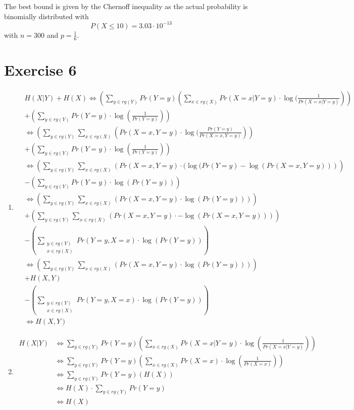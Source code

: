 \documentclass[12pt]{article}
\begin{document}
The best bound is given by the Chernoff inequality as the actual probability is binomially distributed with \[ P(X\leq 10) = 3.03 \cdot 10^{-13} \] with $n = 300 $ and $p = \frac{1}{6}$.

\section*{Exercise 6}
\begin{enumerate}[label=(\alph*)]
	\item	\begin{align*}
				& H(X \vert Y) + H(X) \Leftrightarrow (\sum_{y \in rg(Y)} Pr(Y=y) \left( \sum_{x \in rg(X)} Pr(X=x \vert Y=y) \cdot \log(\frac{1}{Pr(X=x \vert Y=y)} \right)) \\
				& + (\sum_{y \in rg(Y)} Pr(Y=y) \cdot \log(\frac{1}{Pr(Y=y)})) \\
				&\Leftrightarrow (\sum_{y \in rg(Y)} \sum_{x \in rg(X)} \left(  Pr(X=x, Y=y) \cdot \log(\frac{Pr(Y=y)}{Pr(X=x, Y=y)} \right)) \\
				& + (\sum_{y \in rg(Y)} Pr(Y=y) \cdot \log(\frac{1}{Pr(Y=y)})) \\
				&\Leftrightarrow (\sum_{y \in rg(Y)} \sum_{x \in rg(X)} \left( Pr(X=x, Y=y) \cdot (\log(Pr(Y=y) - \log(Pr(X=x, Y=y)) \right)) \\
				& - (\sum_{y \in rg(Y)} Pr(Y=y) \cdot \log(Pr(Y=y))) \\
				&\Leftrightarrow (\sum_{y \in rg(Y)} \sum_{x \in rg(X)} \left( Pr(X=x, Y=y) \cdot \log(Pr(Y=y)) \right)) \\
				& + (\sum_{y \in rg(Y)} \sum_{x \in rg(X)} \left( Pr(X=x, Y=y) \cdot -\log(Pr(X=x, Y=y)) \right)) \\
				& - (\sum\limits_{\substack{y \in rg(Y) \\ x \in rg(X)}} Pr(Y=y, X=x) \cdot \log(Pr(Y=y))) \\
				&\Leftrightarrow (\sum_{y \in rg(Y)} \sum_{x \in rg(X)} \left( Pr(X=x, Y=y) \cdot \log(Pr(Y=y)) \right)) \\
				& + H(X,Y) \\
				& - (\sum\limits_{\substack{y \in rg(Y) \\ x \in rg(X)}} Pr(Y=y, X=x) \cdot \log(Pr(Y=y))) \\
				&\Leftrightarrow H(X,Y)
			\end{align*}
	\item	\begin{align*}
				H(X \vert Y) &\Leftrightarrow \sum_{y \in rg(Y)} Pr(Y=y) \left( \sum_{x \in rg(X)} Pr(X=x \vert Y=y) \cdot \log(\frac{1}{Pr(X=x \vert Y=y)}) \right) \\
				&\Leftrightarrow \sum_{y \in rg(Y)} Pr(Y=y) \left( \sum_{x \in rg(X)} Pr(X=x) \cdot \log(\frac{1}{Pr(X=x)}) \right) \\
				&\Leftrightarrow \sum_{y \in rg(Y)} Pr(Y=y) \left( H(X) \right) \\
				&\Leftrightarrow H(X) \cdot \sum_{y \in rg(Y)} Pr(Y=y) \\
				&\Leftrightarrow H(X) \\
			\end{align*}
\end{enumerate}
\end{document}
